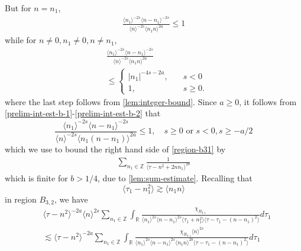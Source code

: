 \documentclass[12pt,reqno]{amsart}
\numberwithin{equation}{section}  %
\numberwithin{figure}{section}
\newcommand{\rr}{\mathbb{R}}
\newcommand{\zz}{\mathbb{Z}}
\theoremstyle{plain}
\theoremstyle{definition}
\theoremstyle{remark}
\begin{document}
%
%
But for $n = n_{1}$, 
%
%
\begin{equation}
  \label{prelim-int-est-b-1}
\begin{split}
\frac{\langle n_1 \rangle ^{-2s} \langle n - n_{1} \rangle ^{-2s}}{\langle
n \rangle ^{-2s} \langle n_{1}n \rangle
^{2a}} \le 1
\end{split}
\end{equation}
while for $n \neq 0, n_{1} \neq 0, n \neq n_{1}$, 
\begin{equation}
  \begin{split}
  \label{prelim-int-est-b-2}
& \frac{\langle n_1 \rangle ^{-2s} \langle n - n_{1} \rangle ^{-2s}}{\langle
n \rangle ^{-2s} \langle n_{1}n \rangle
^{2a}} 
\\
& \le \begin{cases}
  | n_{1} |^{-4s-2a} , \quad & s < 0
\\
1, \quad  & s \ge 0. 
\end{cases}
\end{split}
\end{equation}
%
%
where the last step follows from \autoref{lem:integer-bound}. Since $a \ge 0$,
it follows from \eqref{prelim-int-est-b-1}-\eqref{prelim-int-est-b-2} that 
%
\begin{equation*}
\frac{\langle n_1 \rangle ^{-2s} \langle n - n_{1} \rangle ^{-2s}}{\langle
n \rangle ^{-2s} \langle n_{1}(n - n_{1}) \rangle
^{2a}} \le 1, \quad s \ge 0 \text{ or } s<0, s \ge -a/2 
\end{equation*}
%
%
which we use to bound the right hand side of \eqref{region-b31} by
%
%
\begin{equation*}
\begin{split}
\sum_{n_{1} \in
\zz} 
\frac{1}{\langle \tau - n^{2} + 2nn_{1}  \rangle ^{2b}}
\end{split}
\end{equation*}
%
%
%
which is finite for $b > 1/4$, due to \autoref{lem:sum-estimate}.
Recalling that 
$$ \langle \tau_{1} - n_{1}^{2} \rangle
\gtrsim \langle n_{1}n \rangle$$
%
in region $B_{3,2}$, we have
%
%
\begin{equation*}
\begin{split}
& \langle \tau - n^{2}  \rangle ^{-2a} \langle n
    \rangle ^{2s}
    \sum_{n_{1} \in \zz} \int_{\rr} \frac{\chi_{B_{3,1}}}{ \langle n_{1} \rangle ^{2s} \langle n-n_{1} \rangle ^{2s} 
\langle \tau_{1} + n_{1}^{2}  \rangle \langle  \tau - \tau_{1} - (n -
n_{1})^{2}  \rangle}
d \tau_1 
\\
& \lesssim \langle \tau - n^{2}  \rangle ^{-2a}     \sum_{n_{1} \in \zz} \int_{\rr} \frac{\chi_{B_{3,1}} \langle n
    \rangle ^{2s}
}{ \langle n_{1} \rangle ^{2s} \langle n-n_{1} \rangle ^{2s} 
\langle n_{1}n \rangle ^{2b} \langle  \tau - \tau_{1} - (n -
n_{1})^{2}  \rangle}
d \tau_1 
\end{split}
\end{equation*}
\end{document}
